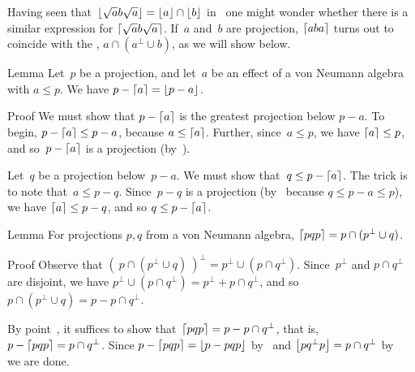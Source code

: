 \documentclass[a]{subfiles}
\begin{document}
\begin{parsec}%
\begin{point}%
Having seen that~$\left\lfloor\sqrt{a}b\sqrt{a}\right\rfloor = \left\lfloor a\right\rfloor\cap\left\lfloor b\right\rfloor$
in~
one might wonder whether
there is a similar expression for $\left\lceil\sqrt{a}b\sqrt{a}\right\rceil$.
If~$a$ and~$b$ are projection,
$\left\lceil aba\right\rceil$ turns out to coincide with the ,
$a\cap (a^\perp \cup b)$,
as we will show below.
\end{point}
\begin{point}{Lemma}%
Let~$p$ be a projection,
and let~$a$ be an effect of a von Neumann algebra
with $a\leq p$.
We have $p-\left\lceil a\right\rceil=\left\lfloor p-a\right\rfloor$.
\end{point}
\begin{point}{Proof}%
We must show that $p-\left\lceil a\right\rceil$ is the greatest projection below $p-a$.
To begin, $p-\left\lceil a\right\rceil\leq p-a$,
because $a\leq \left\lceil a\right\rceil$.
Further, since~$a\leq p$, we have $\left\lceil a\right\rceil\leq p$,
and so~$p-\left\lceil a\right\rceil$ is a projection
(by~).
\begin{point}%
Let~$q$ be a projection below~$p-a$.
We must show that~$q\leq p-\left\lceil a\right\rceil$.
The trick is to note that~$a\leq p-q$.
Since~$p-q$ is a projection (by~
because $q\leq p-a\leq p$),
we have $\left\lceil a\right\rceil\leq p-q$,
and so $q\leq p-\left\lceil a\right\rceil$.
\begin{point}{Lemma}%
For projections $p,q$ from a von Neumann algebra,
$\left\lceil pqp\right\rceil=p\cap (p^\perp \cup q)$.
\end{point}
\end{point}
\end{point}
\begin{point}{Proof}%
Observe that $(\ p\cap (p^\perp \cup q)\ )^\perp 
= p^\perp \cup(p\cap q^\perp)$.
Since~$p^\perp$ and $p\cap q^\perp$ are disjoint,
we have $p^\perp \cup (p\cap q^\perp) = p^\perp + p\cap q^\perp$,
and so $p\cap (p^\perp \cup q) = p-p\cap q^\perp$.
\begin{point}%
By point~, 
it suffices to show that~$\left\lceil pqp\right\rceil=p- p\cap q^\perp$,
that is, $p-\left\lceil pqp\right\rceil=p\cap q^\perp$.
Since $p-\left\lceil pqp\right\rceil = \left\lfloor p-pqp\right\rfloor$
by~ and $\left\lfloor pq^\perp p\right\rfloor=p\cap q^\perp$
by~ we are done.
\end{point}
\end{point}
\end{parsec}
\end{document}

